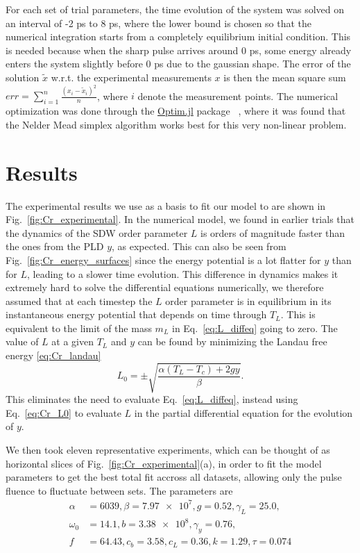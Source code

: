 For each set of trial parameters, the time evolution of the system was solved on an interval of -2 ps to 8 ps, where the lower bound is chosen so that the numerical integration starts from a completely equilibrium initial condition.
This is needed because when the sharp pulse arrives around 0 ps, some energy already enters the system slightly before 0 ps due to the gaussian shape.
The error of the solution $\tilde{x}$ w.r.t. the experimental measurements $x$ is then the mean square sum $err = \sum_{i=1}^n \frac{(x_i - \tilde{x}_i)^2}{n}$, where $i$ denote the measurement points.
The numerical optimization was done through the \href{https://github.com/JuliaNLSolvers/Optim.jl}{Optim.jl} package ~\cite{mogensen2018optim}, where it was found that the Nelder Mead simplex algorithm \cite{Nelder1965} works best for this very non-linear problem.

\section{Results}
The experimental results we use as a basis to fit our model to are shown in Fig.~\ref{fig:Cr_experimental}.
In the numerical model, we found in earlier trials that the dynamics of the SDW order parameter $L$ is orders of magnitude faster than the ones from the PLD $y$, as expected.
This can also be seen from Fig.~\ref{fig:Cr_energy_surfaces} since the energy potential is a lot flatter for $y$ than for $L$, leading to a slower time evolution.
This difference in dynamics makes it extremely hard to solve the differential equations numerically, we therefore assumed that at each timestep the $L$ order parameter is in equilibrium in its instantaneous energy potential that depends on time through $T_L$.
This is equivalent to the limit of the mass $m_L$ in Eq.~\ref{eq:L_diffeq} going to zero.
The value of $L$ at a given $T_L$ and $y$ can be found by minimizing the Landau free energy \ref{eq:Cr_landau} 
\begin{equation}
	\label{eq:Cr_L0}
	L_0 = \pm \sqrt{\frac{\alpha (T_L - T_c) + 2 g y}{\beta}}.
\end{equation}
This eliminates the need to evaluate Eq.~\ref{eq:L_diffeq}, instead using Eq.~\ref{eq:Cr_L0} to evaluate $L$ in the partial differential equation for the evolution of $y$.

We then took eleven representative experiments, which can be thought of as horizontal slices of Fig.~\ref{fig:Cr_experimental}(a), in order to fit the model parameters to get the best total fit accross all datasets, allowing only the pulse fluence to fluctuate between sets.
The parameters are
\begin{align}
	\alpha &= 6039, \beta = \SI{7.97e7}, g = 0.52, \gamma_L = 25.0, \\
	\omega_0 &= 14.1, b = \SI{3.38e8}, \gamma_y = 0.76,\\
	f &= 64.43, c_b = 3.58, c_L = 0.36, k = 1.29, \tau = 0.074
\end{align}

